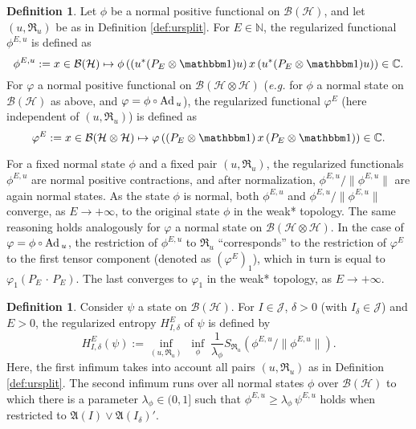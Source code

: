 \documentclass[a4paper,12pt]{article}
\theoremstyle{plain}
\theoremstyle{definition}
\newtheorem{defi}[theo]{Definition}
\theoremstyle{remark}
\newcommand{\compcent}[1]{\vcenter{\hbox{$#1\circ$}}}
\newcommand{\comp}{\mathbin{\mathchoice
{\compcent\scriptstyle}{\compcent\scriptstyle}
{\compcent\scriptscriptstyle}{\compcent\scriptscriptstyle}}}
\def\NN{{\mathbb N}}
\def\B{{\mathcal B}}
\def\H{{\mathcal H}}
\def\Ad{{\hbox{\rm Ad\,}}}
\def\1{{\mathbbm 1}}
\begin{document}
\begin{defi}\label{def:cutstate} Let $\phi$ be a normal positive functional on $\B(\H)$, and let $(u,\mathfrak{R}_u)$ be
as in Definition \ref{def:ursplit}. For $E\in \NN$, the regularized functional $\phi^{E,u}$ is defined as \[ \phi^{E,u} := x\in \B(\H) \mapsto \phi\left((u^*(P_E\otimes \1)u)\,x\,(u^*(P_E\otimes \1)u) \right) \in \mathbb{C}.\]
For $\varphi$ a normal positive functional on $\B(\H\otimes\H)$ (\textit{e.g.}\! for $\phi$ a normal state on $\B(\H)$ as above,
and $\varphi = \phi\comp\Ad_u$), the regularized functional $\varphi^E$ (here independent of $(u,\mathfrak{R}_u)$) is defined as \[ \varphi^E := x\in \B(\H\otimes\H) \mapsto \varphi\left((P_E\otimes \1)\,x\,(P_E\otimes \1) \right) \in \mathbb{C}.\]
\end{defi}

For a fixed normal state $\phi$ and a fixed pair $(u,\mathfrak{R}_u)$, the regularized functionals $\phi^{E,u}$ are normal positive contractions, and after normalization, $\phi^{E,u}/\|\phi^{E,u}\|$ are again normal states. As the state $\phi$ is normal, both $\phi^{E,u}$ and $\phi^{E,u}/\|\phi^{E,u}\|$ converge, as $E\to +\infty$, to the original state $\phi$ in the weak* topology. %
The same reasoning holds analogously for $\varphi$ a normal state on $\B(\H\otimes\H)$.
In the case of $\varphi = \phi\comp\Ad_u$, the restriction of $\phi^{E,u}$ to $\mathfrak{R}_u$ ``corresponds'' to the restriction of $\varphi^E$ to the first tensor component (denoted as $(\varphi^E)_1$), which in turn is equal to $\varphi_1(P_E\,\cdot\,P_E)$. The last converges to $\varphi_1$ in the weak* topology, as $E\to+\infty$.


\begin{defi}\label{def:cut2} Consider $\psi$ a state on $\B(\H)$. For $I\in\mathcal{J}$, $\delta>0$ (with $I_\delta\in\mathcal{J}$) and $E>0$, the regularized entropy $H_{I,\delta}^E$ of $\psi$ is defined by
  \[ H_{I,\delta}^E(\psi) := \inf_{(u,\mathfrak{R}_u)} \; \inf_{\phi} \; \frac{1}{\lambda_\phi}S_{\mathfrak{R}_u}\left(\phi^{E,u}/\|\phi^{E,u}\|\right). \]
  Here, the first infimum takes into account all pairs $(u,\mathfrak{R}_u)$ as in Definition \ref{def:ursplit}.
  The second infimum runs over all normal states $\phi$ over $\B(\H)$ to which there is a parameter $\lambda_\phi\in(0,1]$ such that $\phi^{E,u} \ge \lambda_\phi\,\psi^{E,u}$ holds when restricted to $\mathfrak{A}(I)\vee\mathfrak{A}(I_\delta)'$.
\end{defi}
\end{document}
